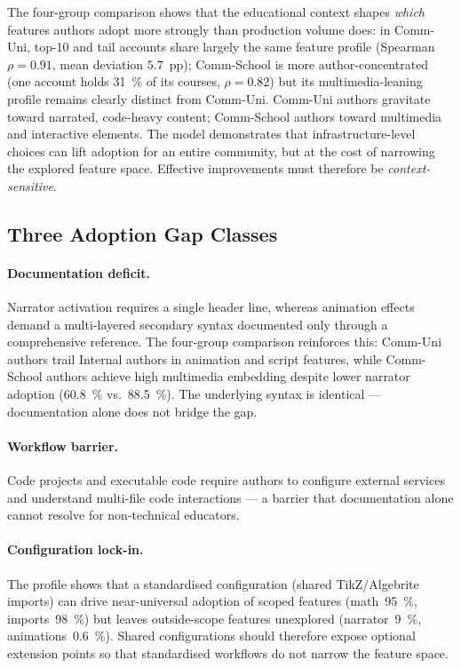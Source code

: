 
The four-group comparison shows that the educational context shapes
\emph{which} features authors adopt more strongly than production
volume does: in Comm-Uni, top-10 and tail accounts share largely
the same feature profile (Spearman $\rho = 0.91$, mean deviation
$5.7$~pp); Comm-School is more author-concentrated (one account
holds \SI{31}{\percent} of its courses, $\rho = 0.82$) but its
multimedia-leaning profile remains clearly distinct from Comm-Uni.
Comm-Uni authors gravitate toward narrated, code-heavy content;
Comm-School authors toward multimedia and interactive elements.
The \mintgroup{} model demonstrates that infrastructure-level choices
can lift adoption for an entire community, but at the cost of narrowing
the explored feature space.
Effective improvements must therefore be \emph{context-sensitive}.

\subsection{Three Adoption Gap Classes}
\label{sec:gap_classes}

\paragraph{Documentation deficit.}
Narrator activation requires a single header line, whereas animation
effects demand a multi-layered secondary syntax documented only
through a comprehensive reference.
The four-group comparison reinforces this: Comm-Uni authors trail
Internal authors in animation and script features, while Comm-School
authors achieve high multimedia embedding despite lower narrator
adoption (\SI{60.8}{\percent} vs.\ \SI{88.5}{\percent}).
The underlying syntax is identical --- documentation alone does not
bridge the gap.

\paragraph{Workflow barrier.}
Code projects and executable code require authors to configure external
services and understand multi-file code interactions --- a barrier that
documentation alone cannot resolve for non-technical educators.

\paragraph{Configuration lock-in.}
The \mintgroup{} profile shows that a standardised configuration
(shared TikZ/Algebrite imports) can drive near-universal adoption of
scoped features (math~\SI{95}{\percent}, imports~\SI{98}{\percent}) but
leaves outside-scope features unexplored (narrator~\SI{9}{\percent},
animations~\SI{0.6}{\percent}).
Shared configurations should therefore expose optional extension points
so that standardised workflows do not narrow the feature space.

